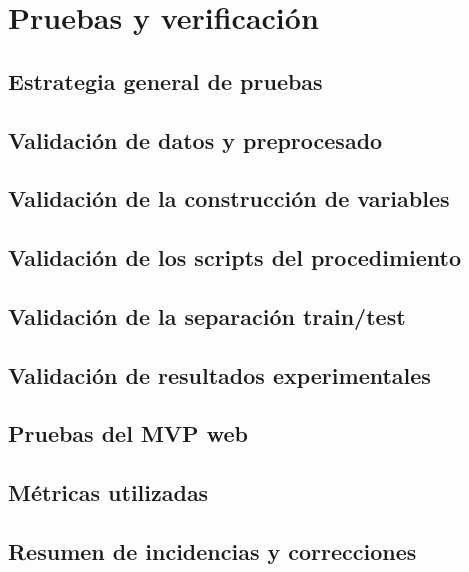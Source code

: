 
\chapter{Pruebas y verificación}\label{cap:pruebas}

\section{Estrategia general de pruebas}\label{sec:estrategia-pruebas}

\section{Validación de datos y preprocesado}\label{sec:validacion-datos}

\section{Validación de la construcción de variables}\label{sec:validacion-variables}

\section{Validación de los scripts del procedimiento}\label{sec:validacion-scripts}

\section{Validación de la separación train/test}\label{sec:validacion-train-test}

\section{Validación de resultados experimentales}\label{sec:validacion-resultados}

\section{Pruebas del MVP web}\label{sec:pruebas-mvp}

\section{Métricas utilizadas}\label{sec:metricas}

\section{Resumen de incidencias y correcciones}\label{sec:incidencias-correcciones}
